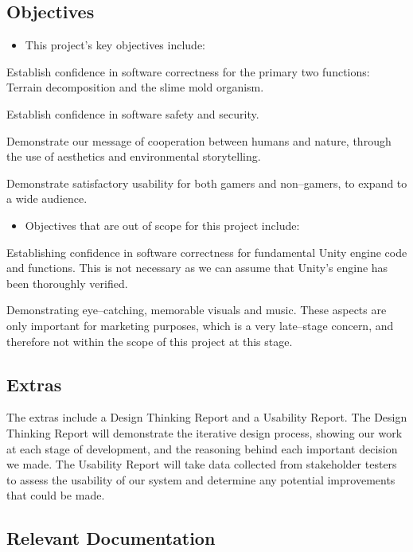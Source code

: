\documentclass[12pt, titlepage]{article}
\begin{document}
\subsection{Objectives}

\begin{itemize}
  \item This project’s key objectives include:
\end{itemize}

Establish confidence in software correctness for the primary two functions: Terrain decomposition and the slime mold organism.

Establish confidence in software safety and security.

Demonstrate our message of cooperation between humans and nature, through the use of aesthetics and environmental storytelling.

Demonstrate satisfactory usability for both gamers and non--gamers, to expand to a wide audience.

\begin{itemize}
  \item Objectives that are out of scope for this project include:
\end{itemize}

Establishing confidence in software correctness for fundamental Unity engine code and functions. This is not necessary as we can assume that Unity’s engine has been thoroughly verified.

Demonstrating eye--catching, memorable visuals and music. These aspects are only important for marketing purposes, which is a very late--stage concern, and therefore not within the scope of this project at this stage.

\subsection{Extras}

The extras include a Design Thinking Report and a Usability Report. The Design Thinking Report will demonstrate the iterative design process, showing our work at each stage of development, and the reasoning behind each important decision we made. The Usability Report will take data collected from stakeholder testers to assess the usability of our system and determine any potential improvements that could be made.

\subsection{Relevant Documentation}
\end{document}
